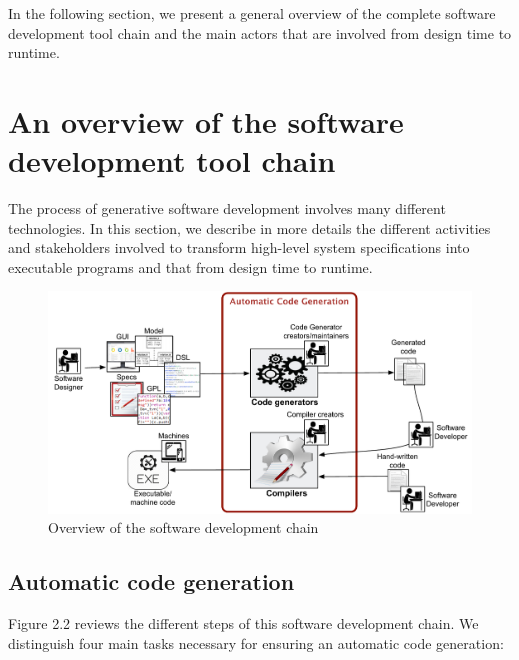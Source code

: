 In the following section, we present a general overview of the complete software development tool chain and the main actors that are involved from design time to runtime.


\section{An overview of the software development tool chain}
The process of generative software development involves many different technologies. In this section, we describe in more details the different activities and stakeholders involved to transform high-level system specifications into executable programs and that from design time to runtime.
\begin{figure}[h]
	\center
	\includegraphics[scale=0.65]{Background/fig/background_overview2.pdf}
	\caption{Overview of the software development chain}
\end{figure}
\subsection{Automatic code generation}
Figure 2.2 reviews the different steps of this software development chain. We distinguish four main tasks necessary for ensuring an automatic code generation: 

 

